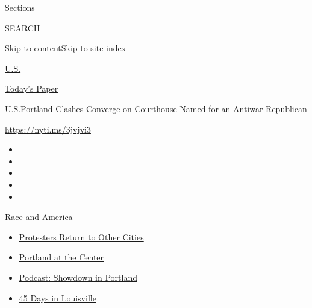 Sections

SEARCH

\protect\hyperlink{site-content}{Skip to
content}\protect\hyperlink{site-index}{Skip to site index}

\href{https://www.nytimes3xbfgragh.onion/section/us}{U.S.}

\href{https://myaccount.nytimes3xbfgragh.onion/auth/login?response_type=cookie\&client_id=vi}{}

\href{https://www.nytimes3xbfgragh.onion/section/todayspaper}{Today's
Paper}

\href{/section/us}{U.S.}\textbar{}Portland Clashes Converge on
Courthouse Named for an Antiwar Republican

\url{https://nyti.ms/3jvjvi3}

\begin{itemize}
\item
\item
\item
\item
\item
\end{itemize}

\href{https://www.nytimes3xbfgragh.onion/news-event/george-floyd-protests-minneapolis-new-york-los-angeles?action=click\&pgtype=Article\&state=default\&region=TOP_BANNER\&context=storylines_menu}{Race
and America}

\begin{itemize}
\tightlist
\item
  \href{https://www.nytimes3xbfgragh.onion/2020/07/26/us/protests-portland-seattle-trump.html?action=click\&pgtype=Article\&state=default\&region=TOP_BANNER\&context=storylines_menu}{Protesters
  Return to Other Cities}
\item
  \href{https://www.nytimes3xbfgragh.onion/2020/07/24/us/portland-oregon-protests-white-race.html?action=click\&pgtype=Article\&state=default\&region=TOP_BANNER\&context=storylines_menu}{Portland
  at the Center}
\item
  \href{https://www.nytimes3xbfgragh.onion/2020/07/23/podcasts/the-daily/portland-protests.html?action=click\&pgtype=Article\&state=default\&region=TOP_BANNER\&context=storylines_menu}{Podcast:
  Showdown in Portland}
\item
  \href{https://www.nytimes3xbfgragh.onion/interactive/2020/07/16/us/black-lives-matter-protests-louisville-breonna-taylor.html?action=click\&pgtype=Article\&state=default\&region=TOP_BANNER\&context=storylines_menu}{45
  Days in Louisville}
\end{itemize}


